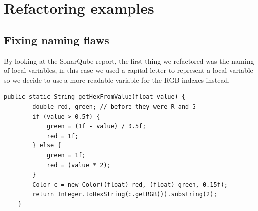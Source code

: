 \documentclass{article}
\begin{document}
\section{Refactoring examples}

\subsection{Fixing naming flaws}
By looking at the SonarQube report, the first thing we refactored was the naming of local variables, in this case we used a capital letter to represent a local variable so we decide to use a more readable variable for the RGB indexes instead.

\begin{lstlisting}[caption={Fixing naming flaws},captionpos=b]
public static String getHexFromValue(float value) {
        double red, green; // before they were R and G
        if (value > 0.5f) {
            green = (1f - value) / 0.5f;
            red = 1f;
        } else {
            green = 1f;
            red = (value * 2);
        }
        Color c = new Color((float) red, (float) green, 0.15f);
        return Integer.toHexString(c.getRGB()).substring(2);
    }
\end{lstlisting}
\end{document}
